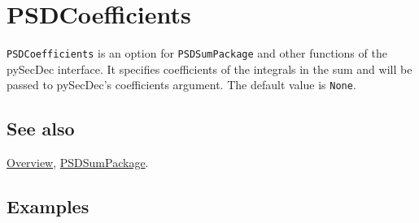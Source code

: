 \documentclass[../FeynHelpersManual.tex]{subfiles}
\begin{document}
\hypertarget{psdcoefficients}{
\section{PSDCoefficients}\label{psdcoefficients}}

\texttt{PSDCoefficients} is an option for \texttt{PSDSumPackage} and
other functions of the pySecDec interface. It specifies coefficients of
the integrals in the sum and will be passed to pySecDec's coefficients
argument. The default value is \texttt{None}.

\subsection{See also}

\hyperlink{toc}{Overview}, \hyperlink{psdsumpackage}{PSDSumPackage}.

\subsection{Examples}
\end{document}
